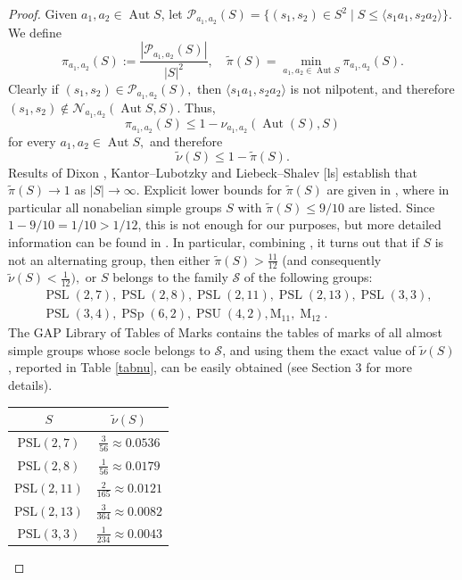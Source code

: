 \documentclass{amsart}
\DeclareMathOperator{\aut}{Aut}
\DeclareMathOperator{\psl}{PSL}
\DeclareMathOperator{\psp}{PSp}
\DeclareMathOperator{\M}{M}
\DeclareMathOperator{\psu}{PSU}
\numberwithin{equation}{section}
\begin{document}
\begin{proof}
	Given $a_1,a_2 \in \aut S$, let $\mathcal P_{a_1,a_2}(S)=\{(s_1,s_2)\in S^2\mid S\leq \langle s_1a_1,s_2a_2\rangle\}$. We define
		$$\pi_{a_1,a_2}(S):=\frac{|\mathcal P_{a_1,a_2}(S)|}{|S|^2}, \quad
\tilde \pi(S)=\min_{a_1,a_2\in \aut S}\pi_{a_1,a_2}(S).$$
Clearly if $(s_1,s_2) \in \mathcal P_{a_1,a_2}(S),$ then
$\langle s_1a_1, s_2a_2\rangle$ is not nilpotent, and therefore $(s_1,s_2) \notin \mathcal N_{a_1,a_2}(\aut S,S).$
Thus, $$\pi_{a_1,a_2}(S)\leq 1-\nu_{a_1,a_2}(\aut(S),S)$$ for every $a_1, a_2\in \aut S,$ and therefore $$\tilde \nu(S)\leq 1-\tilde\pi(S).$$
Results of Dixon \cite{dix}, Kantor–Lubotzky \cite{kl} and Liebeck–Shalev [ls] establish
that $\tilde\pi(S) \to 1$ as $|S| \to \infty.$ 
Explicit lower bounds for $\tilde\pi(S)$ are given in \cite{nina}, where in particular all nonabelian simple groups $S$ with $\tilde\pi(S)\leq 9/10$ are listed. Since $1-9/10=1/10>1/12$, this is not enough for our purposes, but  more detailed information can be found in \cite{tmenezes}. In particular, combining \cite[Table 5.1, Theorem 6.01, Lemma 7.1.1]{tmenezes}, it turns out that if $S$ is not an alternating group, then either $\tilde \pi(S)> \frac{11}{12}$ (and consequently $\tilde\nu(S) < \frac{1}{12}),$ or
$S$ belongs to the family $\mathcal S$  of the following groups:  $$\begin{aligned}&\psl(2,7), \psl(2,8), \psl(2,11), \psl(2,13), \psl(3,3),\\& \psl(3,4), \psp(6,2), \psu(4,2), \mathrm{M}_{11},\M_{12}.\end{aligned}$$ The GAP Library of Tables of Marks \cite{gap} contains the tables of marks of all almost simple groups whose socle belongs to $\mathcal S$, and using them the exact value of $\tilde{\nu}(S)$, reported in Table \ref{tabnu}, can be easily obtained (see Section 3 for more details).
\begin{table}[h]
	\centering
	\renewcommand{\arraystretch}{1.4}
	\begin{tabular}{cc}
		\toprule
		\textbf{$S$} & \textbf{$\tilde{\nu}(S)$} \\
		\midrule
		$\mathrm{PSL}(2,7)$  & $\tfrac{3}{56}    \approx 0.0536$ \\
		$\mathrm{PSL}(2,8)$  & $\tfrac{1}{56}    \approx 0.0179$ \\
		$\mathrm{PSL}(2,11)$ & $\tfrac{2}{165}   \approx 0.0121$ \\
		$\mathrm{PSL}(2,13)$ & $\tfrac{3}{364}   \approx 0.0082$ \\
		$\mathrm{PSL}(3,3)$  & $\tfrac{1}{234}   \approx 0.0043$ \\

\end{tabular}
\end{table}
\end{proof}
\end{document}
